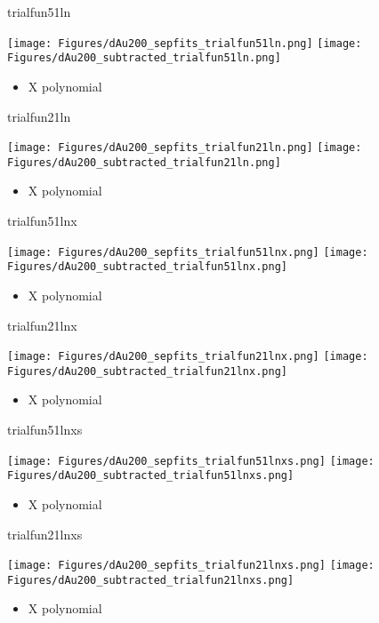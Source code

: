 \documentclass[aspectratio=169,compress,10pt]{beamer}
\begin{document}
\begin{frame}{trialfun51ln}
\begin{center}
\texttt{[image: Figures/dAu200\_sepfits\_trialfun51ln.png]}
\texttt{[image: Figures/dAu200\_subtracted\_trialfun51ln.png]}
\end{center}
\begin{itemize}
\item X polynomial
\end{itemize}
\end{frame}


\begin{frame}{trialfun21ln}
\begin{center}
\texttt{[image: Figures/dAu200\_sepfits\_trialfun21ln.png]}
\texttt{[image: Figures/dAu200\_subtracted\_trialfun21ln.png]}
\end{center}
\begin{itemize}
\item X polynomial
\end{itemize}
\end{frame}


\begin{frame}{trialfun51lnx}
\begin{center}
\texttt{[image: Figures/dAu200\_sepfits\_trialfun51lnx.png]}
\texttt{[image: Figures/dAu200\_subtracted\_trialfun51lnx.png]}
\end{center}
\begin{itemize}
\item X polynomial
\end{itemize}
\end{frame}


\begin{frame}{trialfun21lnx}
\begin{center}
\texttt{[image: Figures/dAu200\_sepfits\_trialfun21lnx.png]}
\texttt{[image: Figures/dAu200\_subtracted\_trialfun21lnx.png]}
\end{center}
\begin{itemize}
\item X polynomial
\end{itemize}
\end{frame}


\begin{frame}{trialfun51lnxs}
\begin{center}
\texttt{[image: Figures/dAu200\_sepfits\_trialfun51lnxs.png]}
\texttt{[image: Figures/dAu200\_subtracted\_trialfun51lnxs.png]}
\end{center}
\begin{itemize}
\item X polynomial
\end{itemize}
\end{frame}


\begin{frame}{trialfun21lnxs}
\begin{center}
\texttt{[image: Figures/dAu200\_sepfits\_trialfun21lnxs.png]}
\texttt{[image: Figures/dAu200\_subtracted\_trialfun21lnxs.png]}
\end{center}
\begin{itemize}
\item X polynomial
\end{itemize}
\end{frame}
\end{document}
